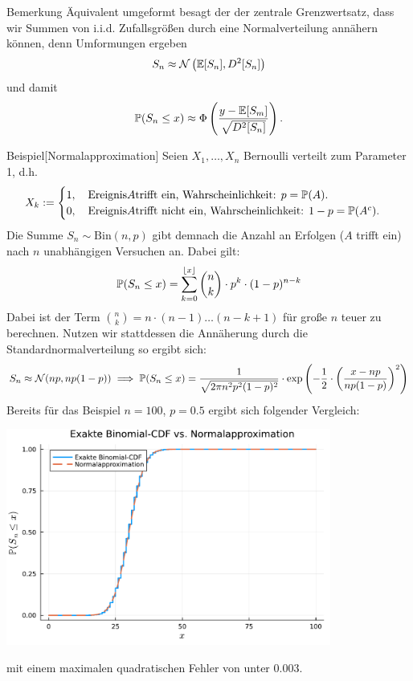\begin{colbox}{Bemerkung}
    Äquivalent umgeformt besagt der der zentrale Grenzwertsatz, dass wir Summen von i.i.d. Zufallsgrößen durch 
    eine Normalverteilung annähern können, denn Umformungen ergeben
    \[
        S_n \approx \mathcal{N}\left(\E[S_n], D^2[S_n]\right)
    \]
    und damit 
    \[
        \P(S_n \leq x) \approx \Phi\left(\dfrac{y-\E[S_m]}{\sqrt{D^2[S_n]}}\right).
    \]
\end{colbox}

\begin{colbox}{Beispiel}[Normalapproximation]
    Seien $X_1,\dots,X_n$ Bernoulli verteilt zum Parameter 1, d.h. 
    \[
        X_k := \begin{cases}
            1, \quad \text{Ereignis} A \text{trifft ein, Wahrscheinlichkeit: } p=\P(A). \\
            0, \quad \text{Ereignis} A \text{trifft nicht ein, Wahrscheinlichkeit: } 1-p=\P(A^c).
        \end{cases}
    \]
    Die Summe $S_n\sim\mathrm{Bin}(n,p)$ gibt demnach die Anzahl an Erfolgen ($A$ trifft ein) 
    nach $n$ unabhängigen Versuchen an. Dabei gilt:
    \[
        \P(S_n \leq x) = \sum_{k=0}^{\lfloor x \rfloor} \binom{n}{k}\cdot p^k\cdot(1-p)^{n-k}
    \]
    Dabei ist der Term $\binom{n}{k} = n\cdot(n-1)\dots(n-k+1)$ für große $n$ teuer zu berechnen. Nutzen wir stattdessen 
    die Annäherung durch die Standardnormalverteilung so ergibt sich:
    \[
        S_n\approx\mathcal{N}(np,np(1-p)) \implies 
        \P(S_n \leq x) 
        = \dfrac{1}{\sqrt{2\pi n^2p^2(1-p)^2}}\cdot\exp\left(-\dfrac{1}{2}\cdot\left(\dfrac{x-np}{np(1-p)}\right)^2\right)
    \]
    Bereits für das Beispiel $n=100$, $p=0.5$ ergibt sich folgender Vergleich:
    \begin{center}
        \includegraphics[width=0.8\textwidth]{images/vergleich_cdf.pdf}
    \end{center}
    mit einem maximalen quadratischen Fehler von unter 0.003.
\end{colbox}

